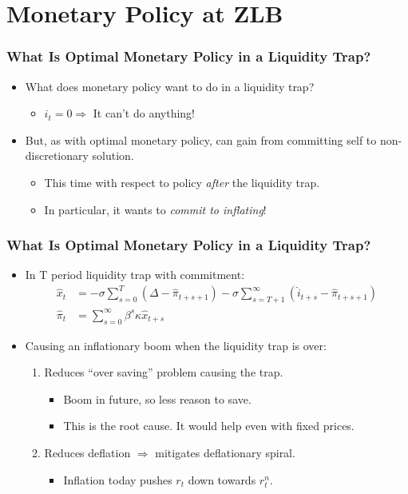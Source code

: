 \documentclass[english,xcolor=svgnames]{beamer}
\begin{document}
\section{Monetary Policy at ZLB}


\begin{frame}
\frametitle{What Is Optimal Monetary Policy in a Liquidity Trap?}
\begin{itemize}
	\item What does monetary policy want to do in a liquidity trap?
	\begin{itemize}
		\item $i_t=0 \Rightarrow$ It can't do anything!
	\end{itemize}
	\item But, as with optimal monetary policy, can gain from committing self to non-discretionary solution.
	\begin{itemize}
		\item This time with respect to policy \emph{after} the liquidity trap.
		\item In particular, it wants to \emph{commit to inflating}!
	\end{itemize}
\end{itemize}	
\end{frame}


\begin{frame}
\frametitle{What Is Optimal Monetary Policy in a Liquidity Trap?}
\begin{itemize}
	\item In T period liquidity trap with commitment:
	\begin{align*}
		\hat{x}_t &= -\sigma \sum_{s=0}^{T}(\Delta-\hat{\pi}_{t+s+1}) -\sigma \sum_{s=T+1}^{\infty}(\hat{i}_{t+s}-\hat{\pi}_{t+s+1}) \\
		\hat{\pi}_t&=\sum_{s=0}^{\infty}\beta^s \kappa \hat{x}_{t+s}
	\end{align*}
	\item Causing an inflationary boom when the liquidity trap is over:
	\begin{enumerate}[1.]
		\item Reduces ``over saving'' problem causing the trap.
		\begin{itemize}
			\item Boom in future, so less reason to save.
			\item This is the root cause. It would help even with fixed prices.
		\end{itemize}
		\item Reduces deflation $\Rightarrow$ mitigates deflationary spiral.
		\begin{itemize}
			\item Inflation today pushes $r_t$ down towards $r_{t}^{n}$.
		\end{itemize}
	\end{enumerate}
\end{itemize}	
\end{frame}
\end{document}
